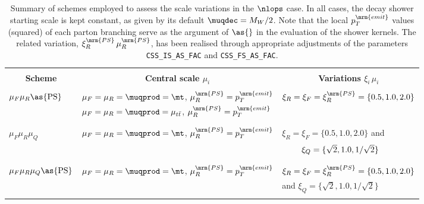 \begin{table}[tb!]
\begin{center}
\begin{tabular}{|l|l|l|}
\hline&&\\[-3mm]
\multicolumn{1}{|c|}{\textbf{Scheme}} &
\multicolumn{1}{|c|}{\textbf{\boldmath Central scale $\mu_i$}} &
\multicolumn{1}{|c|}{\textbf{\boldmath Variations $\xi_i\,\mu_i$}}\\[1mm]
\hline&&\\[-5pt]
$\mu_F\mu_R\as{\mathrm{PS}}$ &
$\mu_F=\mu_R=\muqprod=\mt$, $\mu_R^\mrm{PS}=p_T^\mrm{emit}$ &
$\xi_R=\xi_F=\xi_R^\mrm{PS}=\{0.5,1.0,2.0\}$\\
&$\mu_F=\mu_R=\muqprod=\mu_{t\bar{t}}$, $\mu_R^\mrm{PS}=p_T^\mrm{emit}$&\\
&&\\[-6pt]
\hline&&\\[-5pt]
$\mu_F\mu_R\mu_Q$ &
$\mu_F=\mu_R=\muqprod=\mt$, $\mu_R^\mrm{PS}=p_T^\mrm{emit}$ &
$\xi_R=\xi_F=\{0.5,1.0,2.0\}$ and\\&&
$\hphantom{\xi_R=\,}\xi_Q=\{\sqrt2,1.0,1/\sqrt2\}$\\
&&\\[-6pt]
\hline&&\\[-5pt]
$\mu_F\mu_R\mu_Q\as{\mathrm{PS}}$ &
$\mu_F=\mu_R=\muqprod=\mt$, $\mu_R^\mrm{PS}=p_T^\mrm{emit}$ &
$\xi_R=\xi_F=\xi_R^\mrm{PS}=\{0.5,1.0,2.0\}$\\&&
and $\xi_Q=\{\sqrt2,1.0,1/\sqrt2\}$\\[-5pt]
&&\\
\hline
\end{tabular}
\end{center}
\caption{\label{tab:scalevars_nlops}%
  Summary of schemes employed to assess the scale variations in the
  $\nlops$ case. In all cases, the decay shower starting scale is kept
  constant, as given by its default $\muqdec=M_W/2$. Note that the
  local $p_T^\mrm{emit}$ values (squared) of each parton branching
  serve as the argument of $\as{}$ in the evaluation of the shower
  kernels. The related variation, $\xi_R^\mrm{PS}\,\mu_R^\mrm{PS}$,
  has been realised through appropriate adjustments of the
   parameters {\tt CSS\_IS\_AS\_FAC} and {\tt CSS\_FS\_AS\_FAC}.}
\end{table}


